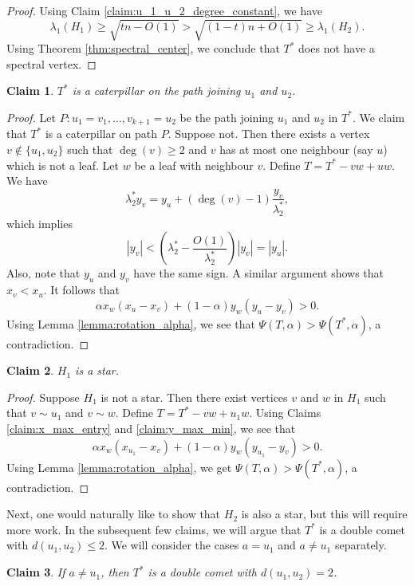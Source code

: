 \documentclass[11pt]{article}
\theoremstyle{plain}
\newtheorem{claim}{Claim}[section]
\numberwithin{equation}{section}
\begin{document}
\begin{proof}
Using Claim \ref{claim:u_1_u_2_degree_constant}, we have 
\[ \lambda_1(H_1)\ge \sqrt{tn - O(1)} >\sqrt{(1-t)n + O(1)}\ge \lambda_1(H_2).\]
Using Theorem \ref{thm:spectral_center}, we conclude that $T^*$ does not have a spectral vertex.
\end{proof}

\begin{claim}\label{claim:u_1_u_2_caterpillar}
$T^*$ is a caterpillar on the path joining $u_1$ and $u_2$. 
\end{claim}

\begin{proof}
Let $P: u_1=v_1, \ldots, v_{k+1}=u_2$ be the path joining $u_1$ and $u_2$ in $T^*$. We claim that $T^*$ is a caterpillar on path $P$. Suppose not. Then there exists a vertex $v\notin \{u_1, u_2\}$ such that $\deg(v)\ge 2$ and $v$ has at most one neighbour (say $u$) which is not a leaf. Let $w$ be a leaf with neighbour $v$. Define $T=T^*-vw + uw$. We have 
\[ \lambda_2^* y_v = y_u + (\deg(v)-1)\frac{y_v}{\lambda_2^*},\]
which implies 
\[|y_v| < \left(\lambda_2^* - \frac{O(1)}{\lambda_2^*}\right)|y_v| = |y_u|.\] 
Also, note that $y_u$ and $y_v$ have the same sign. A similar argument shows that $x_v < x_u$. It follows that 
\[\alpha x_w(x_u - x_v) + (1-\alpha)y_w(y_u - y_v)>0.\]
Using Lemma \ref{lemma:rotation_alpha}, we see that $\Psi(T, \alpha)>\Psi(T^*, \alpha)$, a contradiction. 
\end{proof}

\begin{claim}\label{claim:H_1_star}
    $H_1$ is a star. 
\end{claim}

\begin{proof}
Suppose $H_1$ is not a star. Then there exist vertices $v$ and $w$ in $H_1$ such that $v\sim u_1$ and $v\sim w$. Define $T = T^* - vw + u_1w$. Using Claims \ref{claim:x_max_entry} and \ref{claim:y_max_min}, we see that 
\[ \alpha x_w(x_{u_1}-x_v) + (1-\alpha)y_w(y_{u_1}-y_v) > 0.\]
Using Lemma \ref{lemma:rotation_alpha}, we get $\Psi(T, \alpha) > \Psi(T^*, \alpha)$, a contradiction.
\end{proof}

Next, one would naturally like to show that $H_2$ is also a star, but this will require more work. In the subsequent few claims, we will argue that $T^*$ is a double comet with $d(u_1, u_2)\le 2$. We will consider the cases $a=u_1$ and $a\neq u_1$ separately. 

\begin{claim}\label{claim:a_not_u1}
    If $a\neq u_1$, then $T^*$ is a double comet with $d(u_1, u_2)=2$. 
\end{claim}
\end{document}
